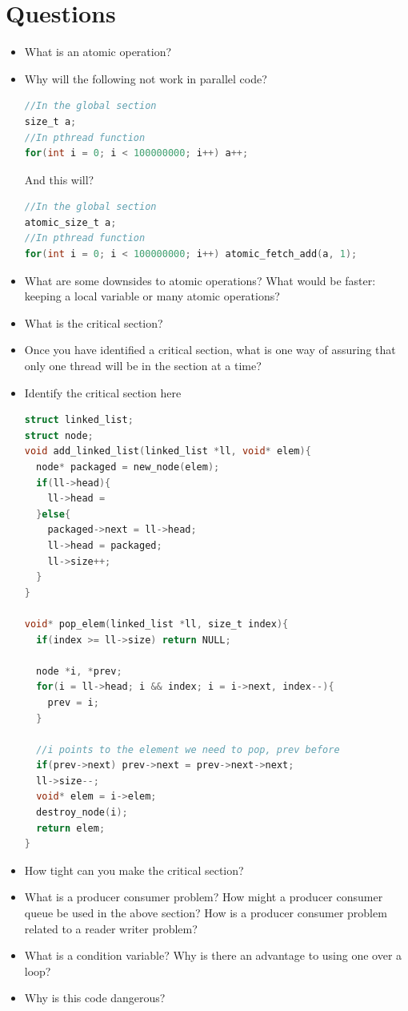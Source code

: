 \section{Questions}

\begin{itemize}
\tightlist
\item
  What is an atomic operation?
\item
  Why will the following not work in parallel code?

\begin{lstlisting}[language=C]
//In the global section
size_t a;
//In pthread function
for(int i = 0; i < 100000000; i++) a++;
\end{lstlisting}

  And this will?

\begin{lstlisting}[language=C]
//In the global section
atomic_size_t a;
//In pthread function
for(int i = 0; i < 100000000; i++) atomic_fetch_add(a, 1);
\end{lstlisting}
\item
  What are some downsides to atomic operations? What would be faster: keeping a local variable or many atomic operations?
\item
  What is the critical section?
\item
  Once you have identified a critical section, what is one way of assuring that only one thread will be in the section at a time?
\item
  Identify the critical section here

\begin{lstlisting}[language=C]
struct linked_list;
struct node;
void add_linked_list(linked_list *ll, void* elem){
  node* packaged = new_node(elem);
  if(ll->head){
    ll->head =
  }else{
    packaged->next = ll->head;
    ll->head = packaged;
    ll->size++;
  }
}

void* pop_elem(linked_list *ll, size_t index){
  if(index >= ll->size) return NULL;

  node *i, *prev;
  for(i = ll->head; i && index; i = i->next, index--){
    prev = i;
  }

  //i points to the element we need to pop, prev before
  if(prev->next) prev->next = prev->next->next;
  ll->size--;
  void* elem = i->elem;
  destroy_node(i);
  return elem;
}
\end{lstlisting}

\item How tight can you make the critical section?
\item What is a producer consumer problem? How might a producer consumer queue be used in the above section? How is a producer consumer problem related to a reader writer problem?
\item What is a condition variable? Why is there an advantage to using one over a  loop?
\item Why is this code dangerous?


\end{itemize}
